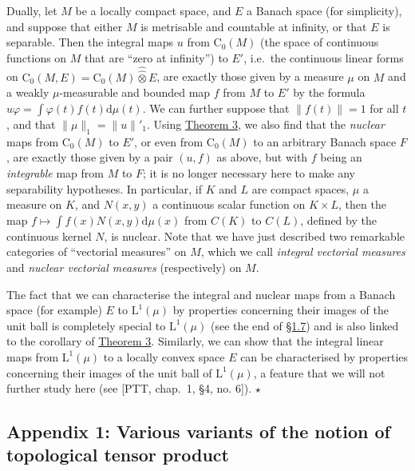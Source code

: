 \documentclass[british]{article}
\begin{document}
Dually, let \(M\) be a locally compact space, and \(E\) a Banach space
(for simplicity), and suppose that either \(M\) is metrisable and
countable at infinity, or that \(E\) is separable. Then the integral
maps \(u\) from \(\mathrm{C}_0(M)\) (the space of continuous functions
on \(M\) that are ``zero at infinity'') to \(E'\), i.e.~the continuous
linear forms on
\(\mathrm{C}_0(M,E)=\mathrm{C}_0(M)\hat{\hat{\otimes}}E\), are exactly
those given by a measure \(\mu\) on \(M\) and a weakly
\(\mu\)-measurable and bounded map \(f\) from \(M\) to \(E'\) by the
formula \(u\varphi=\int\varphi(t)f(t)\mathrm{d}\mu(t)\). We can further
suppose that \(\|f(t)\|=1\) for all \(t\), and that
\(\|\mu\|_1=\|u\|'_1\). Using \hyperref[section-1-theorem-3]{Theorem 3},
we also find that the \emph{nuclear} maps from \(\mathrm{C}_0(M)\) to
\(E'\), or even from \(\mathrm{C}_0(M)\) to an arbitrary Banach space
\(F\), are exactly those given by a pair \((u,f)\) as above, but with
\(f\) being an \emph{integrable} map from \(M\) to \(F\); it is no
longer necessary here to make any separability hypotheses. In
particular, if \(K\) and \(L\) are compact spaces, \(\mu\) a measure on
\(K\), and \(N(x,y)\) a continuous scalar function on \(K\times L\),
then the map \(f\mapsto\int f(x)N(x,y)\mathrm{d}\mu(x)\) from \(C(K)\)
to \(C(L)\), defined by the continuous kernel \(N\), is nuclear. Note
that we have just described two remarkable categories of ``vectorial
measures'' on \(M\), which we call \emph{integral vectorial measures}
and \emph{nuclear vectorial measures} (respectively) on \(M\).

The fact that we can characterise the integral and nuclear maps from a
Banach space (for example) \(E\) to \(\mathrm{L}^1(\mu)\) by properties
concerning their images of the unit ball is completely special to
\(\mathrm{L}^1(\mu)\) (see the end of \hyperref[section-1.7]{§1.7}) and
is also linked to the corollary of
\hyperref[section-1-theorem-3]{Theorem 3}. Similarly, we can show that
the integral linear maps from \(\mathrm{L}^1(\mu)\) to a locally convex
space \(E\) can be characterised by properties concerning their images
of the unit ball of \(\mathrm{L}^1(\mu)\), a feature that we will not
further study here (see {[}PTT, chap.~1, §4, no. 6{]}). \(\star\)

\subsection*{Appendix 1: Various variants of the notion of topological
tensor product}\label{section-1-appendix-1}
\end{document}

